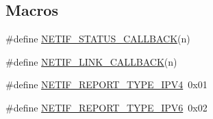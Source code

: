 \subsection*{Macros}
\begin{DoxyCompactItemize}
\item 
\#define \hyperlink{openmote-cc2538_2lwip_2src_2core_2netif_8c_a67d78318251432e9e4416f7ceab23ecb}{N\+E\+T\+I\+F\+\_\+\+S\+T\+A\+T\+U\+S\+\_\+\+C\+A\+L\+L\+B\+A\+CK}(n)
\item 
\#define \hyperlink{openmote-cc2538_2lwip_2src_2core_2netif_8c_aa4ea2644fa9858891412e976a24a0179}{N\+E\+T\+I\+F\+\_\+\+L\+I\+N\+K\+\_\+\+C\+A\+L\+L\+B\+A\+CK}(n)
\item 
\#define \hyperlink{openmote-cc2538_2lwip_2src_2core_2netif_8c_a37701a2fa58ceec8afb2ba5e5cf9d369}{N\+E\+T\+I\+F\+\_\+\+R\+E\+P\+O\+R\+T\+\_\+\+T\+Y\+P\+E\+\_\+\+I\+P\+V4}~0x01
\item 
\#define \hyperlink{openmote-cc2538_2lwip_2src_2core_2netif_8c_a9f7f89a72acd6e158d750076c1970565}{N\+E\+T\+I\+F\+\_\+\+R\+E\+P\+O\+R\+T\+\_\+\+T\+Y\+P\+E\+\_\+\+I\+P\+V6}~0x02
\end{DoxyCompactItemize}
